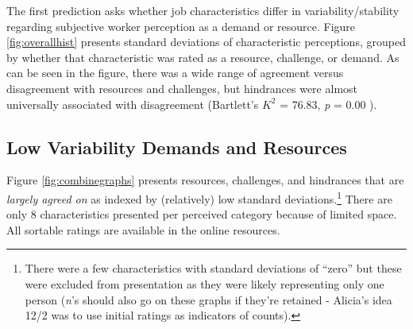 \documentclass[
  english,
  man]{apa6}
\begin{document}
The first prediction asks whether job characteristics differ in variability/stability regarding
subjective worker perception as a demand or resource. Figure \ref{fig:overallhist} presents standard deviations of characteristic perceptions, grouped by whether that characteristic was rated as a resource, challenge, or demand. As can be seen in the figure, there was a wide range of agreement versus disagreement with resources and challenges, but hindrances were almost universally associated with disagreement (Bartlett's \(K^2\) = 76.83, \emph{p} = 0.00 ).

\hypertarget{low-variability-demands-and-resources}{%
\subsection{Low Variability Demands and Resources}\label{low-variability-demands-and-resources}}

Figure \ref{fig:combinegraphs} presents resources, challenges, and hindrances that are \emph{largely agreed on} as indexed by (relatively) low standard deviations.\footnote{There were a few characteristics with standard deviations of ``zero'' but these were excluded from presentation as they were likely representing only one person (\emph{n}'s should also go on these graphs if they're retained - Alicia's idea 12/2 was to use initial ratings as indicators of counts).} There are only 8 characteristics presented per perceived category because of limited space. All sortable ratings are available in the online resources.
\end{document}
